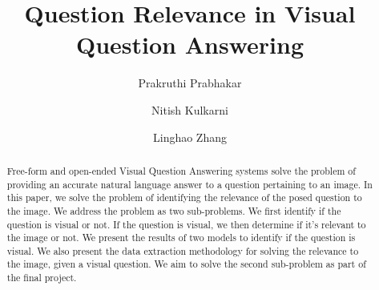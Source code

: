 \documentclass[sigconf]{acmart}
\begin{document}
\title{Question Relevance in Visual Question Answering}
\author{Prakruthi Prabhakar}

\author{Nitish Kulkarni}

\author{Linghao Zhang}

\begin{abstract}
Free-form and open-ended Visual Question Answering systems solve the problem of providing an accurate natural language answer to a question pertaining to an image. In this paper, we solve the problem of identifying the relevance of the posed question to the image. We address the problem as two sub-problems. We first identify if the question is visual or not. If the question is visual, we then determine if it's relevant to the image or not. We present the results of two models to identify if the question is visual. We also present the data extraction methodology for solving the relevance to the image, given a visual question. We aim to solve the second sub-problem as part of the final project. 
\end{abstract}

\maketitle




 
\end{document}
